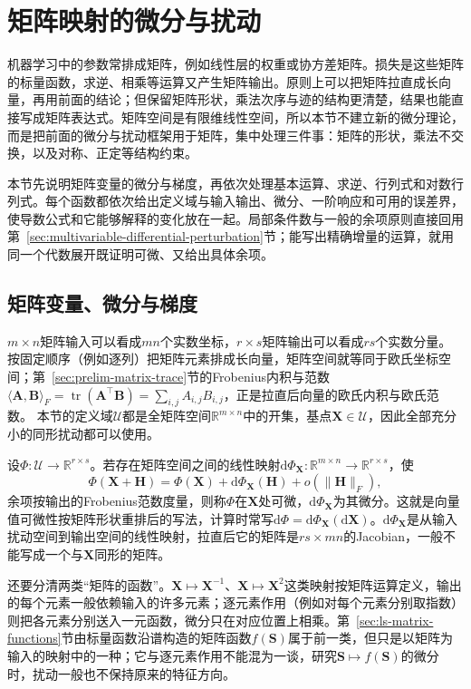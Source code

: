 \section{矩阵映射的微分与扰动}
\label{sec:multivariable-matrix-perturbation}
\label{sec:multivariable-matrix-differentiation}

机器学习中的参数常排成矩阵，例如线性层的权重或协方差矩阵。损失是这些矩阵的标量函数，求逆、相乘等运算又产生矩阵输出。原则上可以把矩阵拉直成长向量，再用前面的结论；但保留矩阵形状，乘法次序与迹的结构更清楚，结果也能直接写成矩阵表达式。矩阵空间是有限维线性空间，所以本节不建立新的微分理论，而是把前面的微分与扰动框架用于矩阵，集中处理三件事：矩阵的形状，乘法不交换，以及对称、正定等结构约束。

本节先说明矩阵变量的微分与梯度，再依次处理基本运算、求逆、行列式和对数行列式。每个函数都依次给出定义域与输入输出、微分、一阶响应和可用的误差界，使导数公式和它能够解释的变化放在一起。局部条件数与一般的余项原则直接回用第~\ref{sec:multivariable-differential-perturbation}节；能写出精确增量的运算，就用同一个代数展开既证明可微、又给出具体余项。

\subsection{矩阵变量、微分与梯度}
\label{sec:multivariable-matrix-variable-gradient}

$m\times n$矩阵输入可以看成$mn$个实数坐标，$r\times s$矩阵输出可以看成$rs$个实数分量。按固定顺序（例如逐列）把矩阵元素排成长向量，矩阵空间就等同于欧氏坐标空间；第~\ref{sec:prelim-matrix-trace}节的Frobenius内积与范数$\langle\bm A,\bm B\rangle_F=\operatorname{tr}(\bm A^\top\bm B)=\sum_{i,j}A_{i,j}B_{i,j}$，正是拉直后向量的欧氏内积与欧氏范数。
本节的定义域$\mathcal U$都是全矩阵空间$\mathbb R^{m\times n}$中的开集，基点$\bm X\in\mathcal U$，因此全部充分小的同形扰动都可以使用。

设$\Phi:\mathcal U\to\mathbb R^{r\times s}$。若存在矩阵空间之间的线性映射$\mathrm d\Phi_{\bm X}:\mathbb R^{m\times n}\to\mathbb R^{r\times s}$，使
\[
 \Phi(\bm X+\bm H)=\Phi(\bm X)+\mathrm d\Phi_{\bm X}(\bm H)+o(\lVert\bm H\rVert_F),
\]
余项按输出的Frobenius范数度量，则称$\Phi$在$\bm X$处可微，$\mathrm d\Phi_{\bm X}$为其微分。这就是向量值可微性按矩阵形状重排后的写法，计算时常写$\mathrm d\Phi=\mathrm d\Phi_{\bm X}(\mathrm d\bm X)$。$\mathrm d\Phi_{\bm X}$是从输入扰动空间到输出空间的线性映射，拉直后它的矩阵是$rs\times mn$的Jacobian，一般不能写成一个与$\bm X$同形的矩阵。

还要分清两类“矩阵的函数”。$\bm X\mapsto\bm X^{-1}$、$\bm X\mapsto\bm X^2$这类映射按矩阵运算定义，输出的每个元素一般依赖输入的许多元素；逐元素作用（例如对每个元素分别取指数）则把各元素分别送入一元函数，微分只在对应位置上相乘。第~\ref{sec:ls-matrix-functions}节由标量函数沿谱构造的矩阵函数$f(\bm S)$属于前一类，但只是以矩阵为输入的映射中的一种；它与逐元素作用不能混为一谈，研究$\bm S\mapsto f(\bm S)$的微分时，扰动一般也不保持原来的特征方向。

